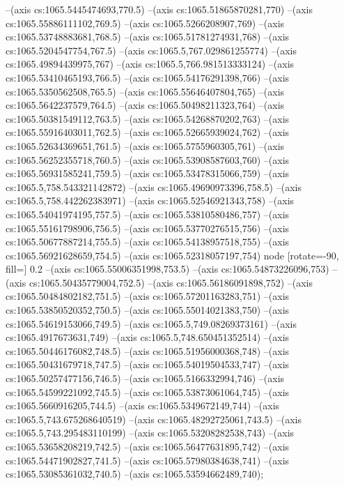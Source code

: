 --(axis cs:1065.5445474693,770.5)
--(axis cs:1065.51865870281,770)
--(axis cs:1065.55886111102,769.5)
--(axis cs:1065.5266208907,769)
--(axis cs:1065.53748883681,768.5)
--(axis cs:1065.51781274931,768)
--(axis cs:1065.5204547754,767.5)
--(axis cs:1065.5,767.029861255774)
--(axis cs:1065.49894439975,767)
--(axis cs:1065.5,766.981513333124)
--(axis cs:1065.53410465193,766.5)
--(axis cs:1065.54176291398,766)
--(axis cs:1065.5350562508,765.5)
--(axis cs:1065.55646407804,765)
--(axis cs:1065.5642237579,764.5)
--(axis cs:1065.50498211323,764)
--(axis cs:1065.50381549112,763.5)
--(axis cs:1065.54268870202,763)
--(axis cs:1065.55916403011,762.5)
--(axis cs:1065.52665939024,762)
--(axis cs:1065.52634369651,761.5)
--(axis cs:1065.5755960305,761)
--(axis cs:1065.56252355718,760.5)
--(axis cs:1065.53908587603,760)
--(axis cs:1065.56931585241,759.5)
--(axis cs:1065.53478315066,759)
--(axis cs:1065.5,758.543321142872)
--(axis cs:1065.49690973396,758.5)
--(axis cs:1065.5,758.442262383971)
--(axis cs:1065.52546921343,758)
--(axis cs:1065.54041974195,757.5)
--(axis cs:1065.53810580486,757)
--(axis cs:1065.55161798906,756.5)
--(axis cs:1065.53770276515,756)
--(axis cs:1065.50677887214,755.5)
--(axis cs:1065.54138957518,755)
--(axis cs:1065.56921628659,754.5)
--(axis cs:1065.52318057197,754) node [rotate=-90, fill=\bgcol] {0.2}
--(axis cs:1065.55006351998,753.5)
--(axis cs:1065.54873226096,753)
--(axis cs:1065.50435779004,752.5)
--(axis cs:1065.56186091898,752)
--(axis cs:1065.50484802182,751.5)
--(axis cs:1065.57201163283,751)
--(axis cs:1065.53850520352,750.5)
--(axis cs:1065.55014021383,750)
--(axis cs:1065.54619153066,749.5)
--(axis cs:1065.5,749.08269373161)
--(axis cs:1065.4917673631,749)
--(axis cs:1065.5,748.650451352514)
--(axis cs:1065.50446176082,748.5)
--(axis cs:1065.51956000368,748)
--(axis cs:1065.50431679718,747.5)
--(axis cs:1065.54019504533,747)
--(axis cs:1065.50257477156,746.5)
--(axis cs:1065.5166332994,746)
--(axis cs:1065.54599221092,745.5)
--(axis cs:1065.53873061064,745)
--(axis cs:1065.5660916205,744.5)
--(axis cs:1065.5349672149,744)
--(axis cs:1065.5,743.675268640519)
--(axis cs:1065.48292725061,743.5)
--(axis cs:1065.5,743.295483110199)
--(axis cs:1065.53208282538,743)
--(axis cs:1065.53658208219,742.5)
--(axis cs:1065.56477631895,742)
--(axis cs:1065.54471902827,741.5)
--(axis cs:1065.57980384638,741)
--(axis cs:1065.53085361032,740.5)
--(axis cs:1065.53594662489,740);

